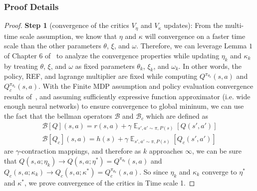 \documentclass{article}
\theoremstyle{definition}
\DeclareMathOperator*{\E}{\mathbb{E}}
\begin{document}
\subsubsection{Proof Details}
\begin{proof}
\textbf{Step 1} (convergence of the critics $V_\eta$ and $V_\kappa$ updates): From the multi-time scale assumption, we know that $\eta$ and $\kappa$ will convergence on a faster time scale than the other parameters $\theta$, $\xi$, and $\omega$. Therefore, we can leverage Lemma $1$ of Chapter $6$ of~\cite{borkar2009stochastic} to analyze the convergence properties while updating $\eta_k$ and $\kappa_k$ by treating $\theta$, $\xi$, and $\omega$ as fixed parameters $\theta_k$, $\xi_k$, and $\omega_k$. In other words, the policy, REF, and lagrange multiplier are fixed while computing $Q^{\pi_{\theta_k}}(s,a)$ and $Q_c^{\pi_{\theta_k}}(s,a)$. With the Finite MDP assumption and policy evaluation convergence results of~\cite{SuttonRL}, and assuming sufficiently expressive function approximator (i.e. wide enough neural networks) to ensure convergence to global mininum, we can use the fact that the bellman operators $\mathcal{B}$ and $\mathcal{B}_c$ which are defined as
\begin{align*}
    \mathcal{B}[Q](s,a) = r(s,a)+\gamma\E_{s',a'\sim \pi,P(s)}[Q(s', a')] \\
    \mathcal{B}
    [Q_c](s,a) = h(s)+\gamma\E_{s',a'\sim \pi,P(s)}[Q_c(s', a')]
\end{align*}
are $\gamma$-contraction mappings, and therefore as $k$ approaches $\infty$, we can be sure that $Q(s,a;\eta_k)\rightarrow Q(s,a;\eta^*)=Q^{\pi_{\theta_k}}(s,a)$ and $Q_c(s,a;\kappa_k)\rightarrow Q_c(s,a;\kappa^*)=Q_c^{\pi_{\theta_k}}(s,a)$. So since $\eta_k$ and $\kappa_k$ converge to $\eta^*$ and $\kappa^*$, we prove convergence of the critics in Time scale 1.


\end{proof}
\end{document}

